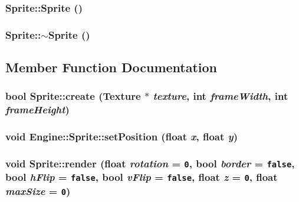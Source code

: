 \subsubsection{\setlength{\rightskip}{0pt plus 5cm}Sprite::Sprite ()}\label{classEngine_1_1Sprite_12cba3ac1868418add3c4d95ce87e615}


\subsubsection{\setlength{\rightskip}{0pt plus 5cm}Sprite::$\sim$Sprite ()}\label{classEngine_1_1Sprite_8accab430f9d90ae5117b57d67e32b84}




\subsection{Member Function Documentation}
\subsubsection{\setlength{\rightskip}{0pt plus 5cm}bool Sprite::create ({\bf Texture} $\ast$ {\em texture}, int {\em frameWidth}, int {\em frameHeight})}\label{classEngine_1_1Sprite_aff71801038b7a3a8a4644fce7f36c0e}


\subsubsection{\setlength{\rightskip}{0pt plus 5cm}void Engine::Sprite::setPosition (float {\em x}, float {\em y})\hspace{0.3cm}{\tt  [inline]}}\label{classEngine_1_1Sprite_f4e19e287b1594d68105eb7eba79410c}


\subsubsection{\setlength{\rightskip}{0pt plus 5cm}void Sprite::render (float {\em rotation} = {\tt 0}, bool {\em border} = {\tt false}, bool {\em hFlip} = {\tt false}, bool {\em vFlip} = {\tt false}, float {\em z} = {\tt 0}, float {\em maxSize} = {\tt 0})}\label{classEngine_1_1Sprite_5c2786869f39fdf95221acc3d83528bc}


